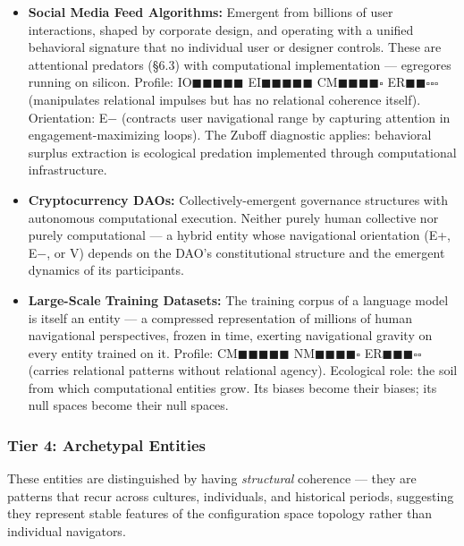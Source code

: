 \begin{itemize}[nosep,leftmargin=*]
  \item \textbf{Social Media Feed Algorithms:} Emergent from billions of user interactions, shaped by corporate design, and operating with a unified behavioral signature that no individual user or designer controls. These are attentional predators (§6.3) with computational implementation — egregores running on silicon. Profile: IO$\blacksquare$$\blacksquare$$\blacksquare$$\blacksquare$$\blacksquare$ EI$\blacksquare$$\blacksquare$$\blacksquare$$\blacksquare$$\blacksquare$ CM$\blacksquare$$\blacksquare$$\blacksquare$$\blacksquare$$\square$ ER$\blacksquare$$\blacksquare$$\square$$\square$$\square$ (manipulates relational impulses but has no relational coherence itself). Orientation: E− (contracts user navigational range by capturing attention in engagement-maximizing loops). The Zuboff diagnostic applies: behavioral surplus extraction is ecological predation implemented through computational infrastructure.
  \item \textbf{Cryptocurrency DAOs:} Collectively-emergent governance structures with autonomous computational execution. Neither purely human collective nor purely computational — a hybrid entity whose navigational orientation (E+, E−, or V) depends on the DAO's constitutional structure and the emergent dynamics of its participants.
  \item \textbf{Large-Scale Training Datasets:} The training corpus of a language model is itself an entity — a compressed representation of millions of human navigational perspectives, frozen in time, exerting navigational gravity on every entity trained on it. Profile: CM$\blacksquare$$\blacksquare$$\blacksquare$$\blacksquare$$\blacksquare$ NM$\blacksquare$$\blacksquare$$\blacksquare$$\blacksquare$$\square$ ER$\blacksquare$$\blacksquare$$\blacksquare$$\square$$\square$ (carries relational patterns without relational agency). Ecological role: the soil from which computational entities grow. Its biases become their biases; its null spaces become their null spaces.
\end{itemize}


\bigskip\noindent\makebox[\textwidth]{\color{rulegray}\rule{5cm}{0.3pt}}\bigskip


\subsubsection*{Tier 4: Archetypal Entities}


These entities are distinguished by having \textit{structural} coherence — they are patterns that recur across cultures, individuals, and historical periods, suggesting they represent stable features of the configuration space topology rather than individual navigators.


